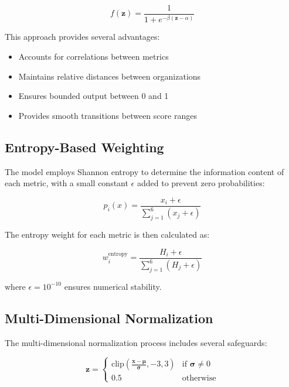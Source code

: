 \documentclass[12pt]{article}
\begin{document}
\begin{equation}
    f(\mathbf{z}) = \frac{1}{1 + e^{-\beta(\mathbf{z} - \alpha)}}
\end{equation}

This approach provides several advantages:
\begin{itemize}
    \item Accounts for correlations between metrics
    \item Maintains relative distances between organizations
    \item Ensures bounded output between 0 and 1
    \item Provides smooth transitions between score ranges
\end{itemize}

\subsection{Entropy-Based Weighting}

The model employs Shannon entropy to determine the information content of each metric, with a small constant $\epsilon$ added to prevent zero probabilities:

\begin{equation}
    p_i(x) = \frac{x_i + \epsilon}{\sum_{j=1}^{6} (x_j + \epsilon)}
\end{equation}

The entropy weight for each metric is then calculated as:

\begin{equation}
    w_i^{\text{entropy}} = \frac{H_i + \epsilon}{\sum_{j=1}^{6} (H_j + \epsilon)}
\end{equation}

where $\epsilon = 10^{-10}$ ensures numerical stability.

\subsection{Multi-Dimensional Normalization}

The multi-dimensional normalization process includes several safeguards:

\begin{equation}
    \mathbf{z} = 
    \begin{cases}
    \text{clip}\left(\frac{\mathbf{x} - \mathbf{\mu}}{\mathbf{\sigma}}, -3, 3\right) & \text{if } \mathbf{\sigma} \neq 0 \\
    0.5 & \text{otherwise}
    \end{cases}
\end{equation}
\end{document}
